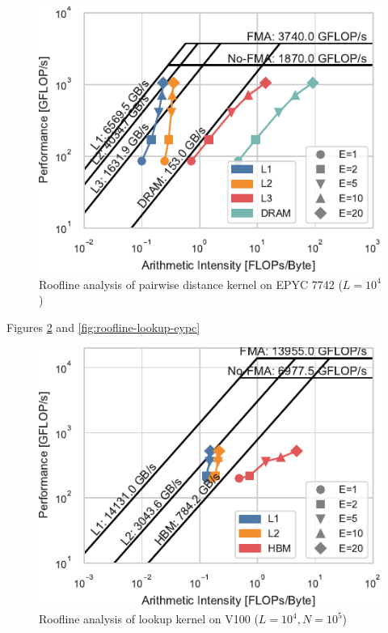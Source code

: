 \documentclass[sigconf]{acmart}
\begin{document}
\begin{figure}
    \centering
    \includegraphics{figs/roofline_distances_epyc}
    \caption{Roofline analysis of pairwise distance kernel on EPYC 7742 ($L=10^4$)}%
    \label{fig:roofline-distances-epyc}
\end{figure}

Figures \ref{fig:roofline-lookup-v100} and \ref{fig:roofline-lookup-eypc}

\begin{figure}
    \centering
    \includegraphics{figs/roofline_lookup_wo_rho_v100}
    \caption{Roofline analysis of lookup kernel on V100 ($L=10^4, N=10^5$)}%
    \label{fig:roofline-lookup-v100}
\end{figure}
\end{document}
